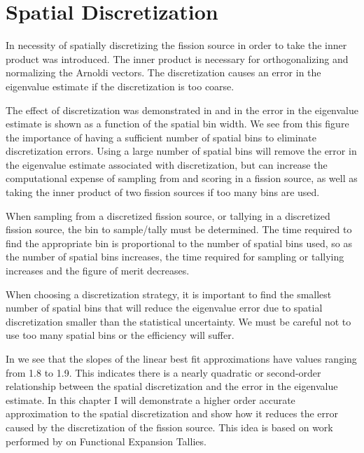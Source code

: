 \chapter{Spatial Discretization \label{ch:SpatialDiscretization}}
In  necessity of spatially discretizing the fission source in order to take the inner product was introduced.  The inner product is necessary for orthogonalizing and normalizing the Arnoldi vectors.  The discretization causes an error in the eigenvalue estimate if the discretization is too coarse.  
 
The effect of discretization was demonstrated in  and in  the error in the eigenvalue estimate is shown as a function of the spatial bin width.   We see from this figure the importance of having a sufficient number of spatial bins to eliminate discretization errors.  Using a large number of spatial bins will remove the error in the eigenvalue estimate associated with discretization, but can increase the computational expense of sampling from and scoring in a fission source, as well as taking the inner product of two fission sources if too many bins are used.

When sampling from a discretized fission source, or tallying in a discretized fission source, the bin to sample/tally must be determined.  The time required to find the appropriate bin is proportional to the number of spatial bins used, so as the number of spatial bins increases, the time required for sampling or tallying increases and the figure of merit decreases.

When choosing a discretization strategy, it is important to find the smallest number of spatial bins that will reduce the eigenvalue error due to spatial discretization smaller than the statistical uncertainty.  We must be careful not to use too many spatial bins or the efficiency will suffer.

In  we see that the slopes of the linear best fit approximations have values ranging from 1.8 to 1.9.  This indicates there is a nearly quadratic or second-order relationship between the spatial discretization and the error in the eigenvalue estimate.  In this chapter I will demonstrate a higher order accurate approximation to the spatial discretization and show how it reduces the error caused by the discretization of the fission source.  This idea is based on work performed by \citet{Griesheimer:2005Funct-0} on Functional Expansion Tallies.

